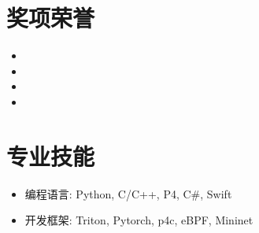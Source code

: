 \documentclass{resume}
\begin{document}
\section{奖项荣誉}

\begin{itemize}[parsep=0.5ex]
  \item {}
  \item {}
  \item {}
  \item {}
\end{itemize}

\section{专业技能}

\begin{itemize}[parsep=0.5ex]
  \item 编程语言: Python, C/C++, P4, C\#, Swift
  \item 开发框架: Triton, Pytorch, p4c, eBPF, Mininet
\end{itemize}
\end{document}
